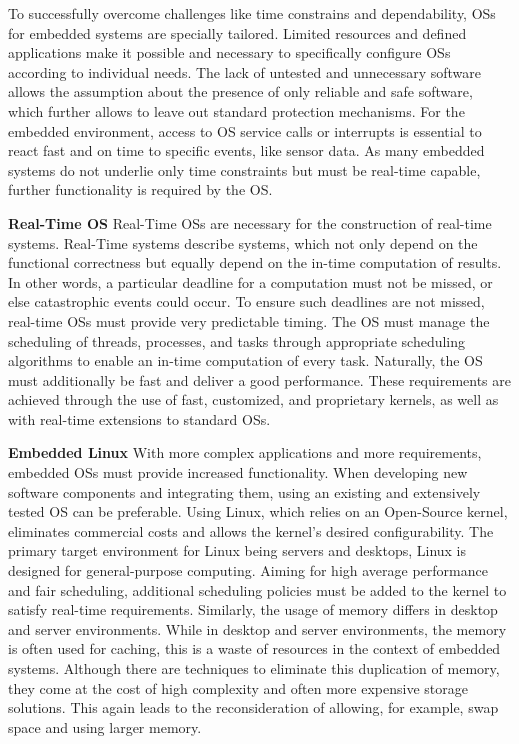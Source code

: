             To successfully overcome challenges like time constrains and dependability, \acp{OS} for embedded systems are specially tailored.
            Limited resources and defined applications make it possible and necessary to specifically configure \acp{OS} according to individual needs.
            The lack of untested and unnecessary software allows the assumption about the presence of only reliable and safe software, which further allows to leave out standard protection mechanisms.
            For the embedded environment, access to \ac{OS} service calls or interrupts is essential to react fast and on time to specific events, like sensor data.
            As many embedded systems do not underlie only time constraints but must be real-time capable, further functionality is required by the \ac{OS}.
            
            \noindent \textbf{Real-Time OS}
            Real-Time \acp{OS} are necessary for the construction of real-time systems.
            Real-Time systems describe systems, which not only depend on the functional correctness but equally depend on the in-time computation of results.
            In other words, a particular deadline for a computation must not be missed, or else catastrophic events could occur.
            To ensure such deadlines are not missed, real-time \acp{OS} must provide very predictable timing.
            The OS must manage the scheduling of threads, processes, and tasks through appropriate scheduling algorithms to enable an in-time computation of every task.            
            Naturally, the \ac{OS} must additionally be fast and deliver a good performance.
            These requirements are achieved through the use of fast, customized, and proprietary kernels, as well as with real-time extensions to standard \acp{OS}.
            
            \noindent \textbf{Embedded Linux}
            With more complex applications and more requirements, embedded \acp{OS} must provide increased functionality.
            When developing new software components and integrating them, using an existing and extensively tested \ac{OS} can be preferable.
            Using Linux, which relies on an Open-Source kernel, eliminates commercial costs and allows the kernel's desired configurability.
            The primary target environment for Linux being servers and desktops, Linux is designed for general-purpose computing.
            Aiming for high average performance and fair scheduling, additional scheduling policies must be added to the kernel to satisfy real-time requirements.
            Similarly, the usage of memory differs in desktop and server environments.
            While in desktop and server environments, the memory is often used for caching, this is a waste of resources in the context of embedded systems.
            Although there are techniques to eliminate this duplication of memory, they come at the cost of high complexity and often more expensive storage solutions.
            This again leads to the reconsideration of allowing, for example, swap space and using larger memory.             
   
